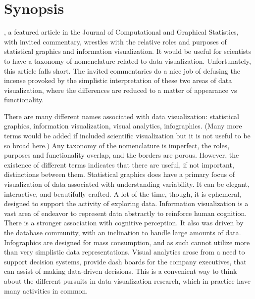 \documentclass[11pt]{article}
\begin{document}


\section{Synopsis}

\citet{gelman2013infovis}, a featured article in the Journal of Computational and Graphical Statistics, with invited commentary, wrestles with the relative roles and purposes of statistical graphics and information visualization. It would be useful for scientists to have a taxonomy of nomenclature related to data visualization. Unfortunately, this article falls short. The invited commentaries do a nice job of defusing the incense provoked by the simplistic interpretation of these two areas of data visualization, where the differences are reduced to a matter of appearance vs functionality.

There are many different names associated with data visualization: statistical graphics, information visualization, visual analytics, infographics. (Many more terms would be added if included scientific visualization but it is not useful to be so broad here.) Any taxonomy of the nomenclature is imperfect, the roles, purposes and functionality overlap, and the borders are porous. However, the existence of different terms indicates that there are useful, if not important, distinctions between them. Statistical graphics does have a primary focus of visualization of data associated with understanding variability. It can be elegant, interactive, and beautifully crafted. A lot of the time, though, it is ephemeral, designed to support the activity of exploring data.  Information visualization is a vast area of endeavor to represent data abstractly to reinforce human cognition. There is a stronger association with cognitive perception. It also was driven by the database community, with an inclination to handle large amounts of data.  Infographics are designed for mass consumption, and as such cannot utilize more than very simplistic data representations.  Visual analytics arose from a need to support decision systems, provide dash boards for the company executives, that can assist of making data-driven decisions. This is a convenient way to think about the different pursuits in data visualization research, which in practice have many activities in common.
\end{document}
